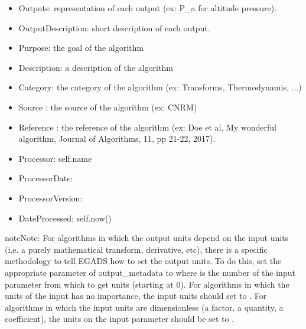 \documentclass[a4paper,10pt,openany,english]{sphinxmanual}
\begin{document}
\begin{enumerate}
\begin{description}
\begin{description}
\begin{itemize}
\item {} 
Outputs: representation of each output (ex: P\_a for altitude pressure).

\item {} 
OutputDescription: short description of each output.

\item {} 
Purpose: the goal of the algorithm

\item {} 
Description: a description of the algorithm

\item {} 
Category: the category of the algorithm (ex: Transforms, Thermodynamis, ...)

\item {} 
Source : the source of the algorithm (ex: CNRM)

\item {} 
Reference : the reference of the algorithm (ex: Doe et al, My wonderful algorithm, Journal of Algorithms, 11, pp 21-22, 2017).

\item {} 
Processor: self.name

\item {} 
ProcessorDate: 

\item {} 
ProcessorVersion: 

\item {} 
DateProcessed: self.now()

\end{itemize}

\end{description}

\end{description}

\end{enumerate}

\begin{sphinxadmonition}{note}{Note:}
For algorithms in which the output units depend on the input units (i.e. a purely mathematical transform, derivative, etc), there is a specific methodology to tell EGADS how to set the output units. To do this, set the appropriate  parameter of output\_metadata to  where  is the number of the input parameter from which to get units (starting at 0). For algorithms in which the units of the input has no importance, the input units should set to . For algorithms in which the input units are dimensionless (a factor, a quantity, a coefficient), the units on the input parameter should be set to .
\end{sphinxadmonition}
\end{document}

